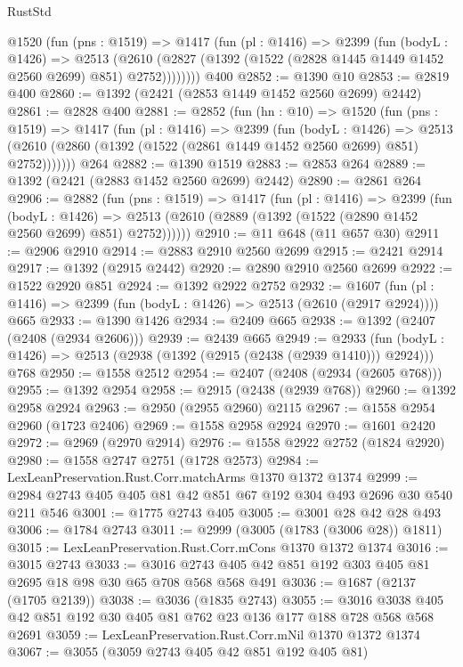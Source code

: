 \begin{lexlean}{RustStd}
\begin{coremodule}
      @1520
        (fun (pns : @1519) =>
        @1417
          (fun (pl : @1416) =>
          @2399
            (fun (bodyL : @1426) =>
            @2513
              (@2610 (@2827 (@1392 (@1522 (@2828 @1445 @1449 @1452 @2560 @2699) @851) @2752))))))))
    @400
@2852 := @1390 @10
@2853 := @2819 @400
@2860 := @1392 (@2421 (@2853 @1449 @1452 @2560 @2699) @2442)
@2861 := @2828 @400
@2881 := @2852
    (fun (hn : @10) =>
    @1520
      (fun (pns : @1519) =>
      @1417
        (fun (pl : @1416) =>
        @2399
          (fun (bodyL : @1426) =>
          @2513 (@2610 (@2860 (@1392 (@1522 (@2861 @1449 @1452 @2560 @2699) @851) @2752)))))))
    @264
@2882 := @1390 @1519
@2883 := @2853 @264
@2889 := @1392 (@2421 (@2883 @1452 @2560 @2699) @2442)
@2890 := @2861 @264
@2906 := @2882
    (fun (pns : @1519) =>
    @1417
      (fun (pl : @1416) =>
      @2399
        (fun (bodyL : @1426) =>
        @2513 (@2610 (@2889 (@1392 (@1522 (@2890 @1452 @2560 @2699) @851) @2752))))))
@2910 := @11 @648 (@11 @657 @30)
@2911 := @2906 @2910
@2914 := @2883 @2910 @2560 @2699
@2915 := @2421 @2914
@2917 := @1392 (@2915 @2442)
@2920 := @2890 @2910 @2560 @2699
@2922 := @1522 @2920 @851
@2924 := @1392 @2922 @2752
@2932 := @1607 (fun (pl : @1416) => @2399 (fun (bodyL : @1426) => @2513 (@2610 (@2917 @2924)))) @665
@2933 := @1390 @1426
@2934 := @2409 @665
@2938 := @1392 (@2407 (@2408 (@2934 @2606)))
@2939 := @2439 @665
@2949 := @2933
    (fun (bodyL : @1426) => @2513 (@2938 (@1392 (@2915 (@2438 (@2939 @1410))) @2924)))
    @768
@2950 := @1558 @2512
@2954 := @2407 (@2408 (@2934 (@2605 @768)))
@2955 := @1392 @2954
@2958 := @2915 (@2438 (@2939 @768))
@2960 := @1392 @2958 @2924
@2963 := @2950 (@2955 @2960) @2115
@2967 := @1558 @2954 @2960 (@1723 @2406)
@2969 := @1558 @2958 @2924
@2970 := @1601 @2420
@2972 := @2969 (@2970 @2914)
@2976 := @1558 @2922 @2752 (@1824 @2920)
@2980 := @1558 @2747 @2751 (@1728 @2573)
@2984 := LexLeanPreservation.Rust.Corr.matchArms @1370 @1372 @1374
@2999 := @2984 @2743 @405 @405 @81 @42 @851 @67 @192 @304 @493 @2696 @30 @540 @211 @546
@3001 := @1775 @2743 @405
@3005 := @3001 @28 @42 @28 @493
@3006 := @1784 @2743
@3011 := @2999 (@3005 (@1783 (@3006 @28)) @1811)
@3015 := LexLeanPreservation.Rust.Corr.mCons @1370 @1372 @1374
@3016 := @3015 @2743
@3033 := @3016 @2743 @405 @42 @851 @192 @303 @405 @81 @2695 @18 @98 @30 @65 @708 @568 @568 @491
@3036 := @1687 (@2137 (@1705 @2139))
@3038 := @3036 (@1835 @2743)
@3055 := @3016 @3038 @405 @42 @851 @192 @30 @405 @81 @762 @23 @136 @177 @188 @728 @568 @568 @2691
@3059 := LexLeanPreservation.Rust.Corr.mNil @1370 @1372 @1374
@3067 := @3055 (@3059 @2743 @405 @42 @851 @192 @405 @81)

\end{coremodule}
\end{lexlean}
